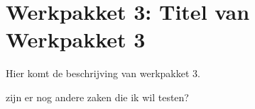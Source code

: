 \section{Werkpakket 3: Titel van Werkpakket 3}
Hier komt de beschrijving van werkpakket 3.

zijn er nog andere zaken die ik wil testen? 